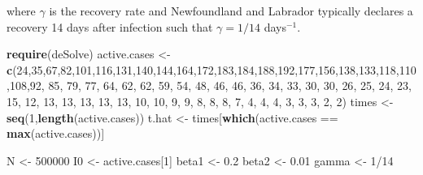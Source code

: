 \documentclass[]{book}
\newenvironment{Shaded}{\begin{snugshade}}{\end{snugshade}}
\newcommand{\KeywordTok}[1]{\textcolor[rgb]{0.13,0.29,0.53}{\textbf{{#1}}}}
\newcommand{\DecValTok}[1]{\textcolor[rgb]{0.00,0.00,0.81}{{#1}}}
\newcommand{\FloatTok}[1]{\textcolor[rgb]{0.00,0.00,0.81}{{#1}}}
\newcommand{\StringTok}[1]{\textcolor[rgb]{0.31,0.60,0.02}{{#1}}}
\newcommand{\NormalTok}[1]{{#1}}
\begin{document}
where \(\gamma\) is the recovery rate and Newfoundland and Labrador
typically declares a recovery 14 days after infection such that
\(\gamma = 1/14\) days\(^{-1}\).

\begin{Shaded}
\begin{Highlighting}[]
\KeywordTok{require}\NormalTok{(deSolve)}
\NormalTok{active.cases <-}\StringTok{ }\KeywordTok{c}\NormalTok{(}\DecValTok{24}\NormalTok{,}\DecValTok{35}\NormalTok{,}\DecValTok{67}\NormalTok{,}\DecValTok{82}\NormalTok{,}\DecValTok{101}\NormalTok{,}\DecValTok{116}\NormalTok{,}\DecValTok{131}\NormalTok{,}\DecValTok{140}\NormalTok{,}\DecValTok{144}\NormalTok{,}\DecValTok{164}\NormalTok{,}\DecValTok{172}\NormalTok{,}\DecValTok{183}\NormalTok{,}\DecValTok{184}\NormalTok{,}\DecValTok{188}\NormalTok{,}\DecValTok{192}\NormalTok{,}\DecValTok{177}\NormalTok{,}\DecValTok{156}\NormalTok{,}\DecValTok{138}\NormalTok{,}\DecValTok{133}\NormalTok{,}\DecValTok{118}\NormalTok{,}\DecValTok{110}\NormalTok{,}\DecValTok{108}\NormalTok{,}\DecValTok{92}\NormalTok{, }\DecValTok{85}\NormalTok{, }\DecValTok{79}\NormalTok{, }\DecValTok{77}\NormalTok{, }\DecValTok{64}\NormalTok{, }\DecValTok{62}\NormalTok{, }\DecValTok{62}\NormalTok{, }\DecValTok{59}\NormalTok{, }\DecValTok{54}\NormalTok{, }\DecValTok{48}\NormalTok{, }\DecValTok{46}\NormalTok{, }\DecValTok{46}\NormalTok{, }\DecValTok{36}\NormalTok{, }\DecValTok{34}\NormalTok{, }\DecValTok{33}\NormalTok{, }\DecValTok{30}\NormalTok{, }\DecValTok{30}\NormalTok{, }\DecValTok{26}\NormalTok{, }\DecValTok{25}\NormalTok{, }\DecValTok{24}\NormalTok{, }\DecValTok{23}\NormalTok{, }\DecValTok{15}\NormalTok{, }\DecValTok{12}\NormalTok{, }\DecValTok{13}\NormalTok{, }\DecValTok{13}\NormalTok{, }\DecValTok{13}\NormalTok{, }\DecValTok{13}\NormalTok{, }\DecValTok{13}\NormalTok{, }\DecValTok{10}\NormalTok{, }\DecValTok{10}\NormalTok{, }\DecValTok{9}\NormalTok{, }\DecValTok{9}\NormalTok{, }\DecValTok{8}\NormalTok{, }\DecValTok{8}\NormalTok{, }\DecValTok{8}\NormalTok{, }\DecValTok{7}\NormalTok{, }\DecValTok{4}\NormalTok{, }\DecValTok{4}\NormalTok{, }\DecValTok{4}\NormalTok{, }\DecValTok{3}\NormalTok{, }\DecValTok{3}\NormalTok{, }\DecValTok{3}\NormalTok{, }\DecValTok{2}\NormalTok{, }\DecValTok{2}\NormalTok{)}
\NormalTok{times <-}\StringTok{ }\KeywordTok{seq}\NormalTok{(}\DecValTok{1}\NormalTok{,}\KeywordTok{length}\NormalTok{(active.cases))}
\NormalTok{t.hat <-}\StringTok{ }\NormalTok{times[}\KeywordTok{which}\NormalTok{(active.cases ==}\StringTok{ }\KeywordTok{max}\NormalTok{(active.cases))]}

\NormalTok{N <-}\StringTok{ }\DecValTok{500000}
\NormalTok{I0 <-}\StringTok{ }\NormalTok{active.cases[}\DecValTok{1}\NormalTok{]}
\NormalTok{beta1 <-}\StringTok{ }\FloatTok{0.2}
\NormalTok{beta2 <-}\StringTok{ }\FloatTok{0.01}
\NormalTok{gamma <-}\StringTok{ }\DecValTok{1}\NormalTok{/}\DecValTok{14}


\end{Highlighting}
\end{Shaded}
\end{document}
